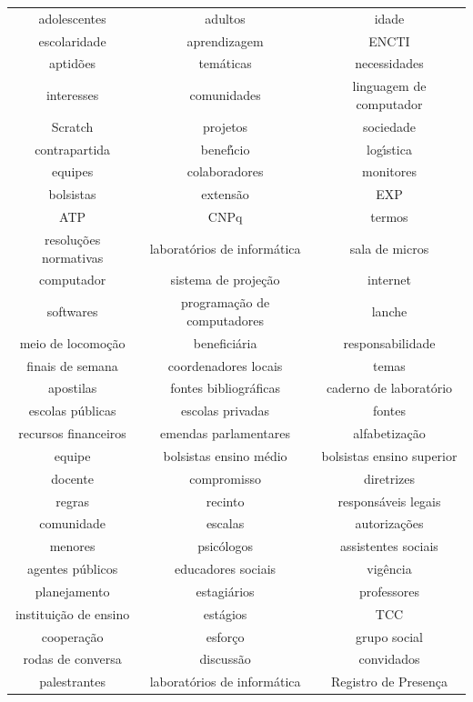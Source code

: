 \documentclass[
12pt,		%
openright,	%
twoside,  %
a4paper,			%
chapter=TITLE,		%
english,			%
french,				%
spanish,			%
brazil				%
]{USPSC-classe/USPSC}
\begin{document}
\begin{table}[htb]
\begin{tabular}{|c|c|c|}
adolescentes  &  adultos  &  idade \\
escolaridade  &  aprendizagem  &  ENCTI \\
aptid\~oes  &  tem\'aticas  &  necessidades \\
interesses  &  comunidades  &  linguagem de computador \\
Scratch  &  projetos  &  sociedade \\
contrapartida  &  benef\'{\i}cio  &  log\'{\i}stica \\
equipes  &  colaboradores  &  monitores \\
bolsistas  &  extens\~ao  &  EXP \\
ATP  &  CNPq  &  termos \\
resolu\c{c}\~oes normativas  &  laborat\'orios de inform\'atica  &  sala de micros  \\
computador  &  sistema de proje\c{c}\~ao  &  internet \\
softwares  &  programa\c{c}\~ao de computadores  &  lanche \\
meio de locomo\c{c}\~ao  &  benefici\'aria  &  responsabilidade \\
finais de semana  &  coordenadores locais  &  temas \\
apostilas  &  fontes bibliogr\'aficas  &  caderno de laborat\'orio \\
escolas p\'ublicas  &  escolas privadas  &  fontes \\
recursos financeiros  &  emendas parlamentares  &  alfabetiza\c{c}\~ao \\
equipe  &  bolsistas ensino m\'edio  &  bolsistas ensino superior \\
docente  &  compromisso  &  diretrizes \\
regras  &  recinto  &  respons\'aveis legais \\
comunidade  &  escalas  &  autoriza\c{c}\~oes \\
menores  &  psic\'ologos  &  assistentes sociais \\
agentes p\'ublicos  &  educadores sociais  &  vig\^encia \\
planejamento  &  estagi\'arios  &  professores \\
institui\c{c}\~ao de ensino  &  est\'agios  &  TCC \\
coopera\c{c}\~ao  &  esfor\c{c}o  &  grupo social \\
rodas de conversa  &  discuss\~ao  &  convidados \\
palestrantes  &  laborat\'orios de inform\'atica  &  Registro de Presen\c{c}a \\

\end{tabular}
\end{table}
\end{document}
